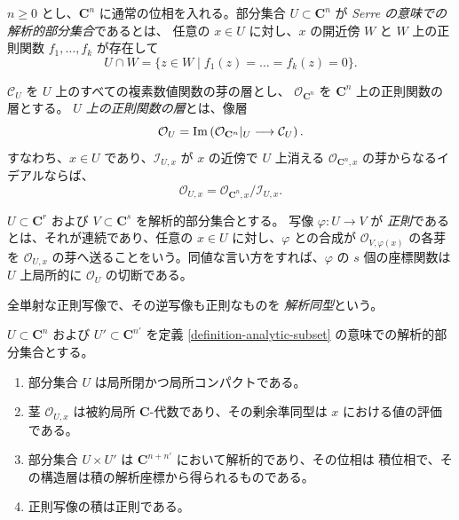 \begin{definition}
\label{definition-analytic-subset}
\begin{reference}
\cite[\S 1、第1項、3--4頁]{GAGA}
\end{reference}
$n \geq 0$ とし、$\mathbf C^n$ に通常の位相を入れる。部分集合
$U \subset \mathbf C^n$ が {\it Serre の意味での解析的部分集合}であるとは、
任意の $x \in U$ に対し、$x$ の開近傍 $W$ と $W$ 上の正則関数
$f_1, \ldots, f_k$ が存在して
$$
U \cap W = \{z \in W \mid f_1(z)=\ldots=f_k(z)=0\}.
$$

$\mathcal C_U$ を $U$ 上のすべての複素数値関数の芽の層とし、
$\mathcal O_{\mathbf C^n}$ を $\mathbf C^n$ 上の正則関数の層とする。
{\it $U$ 上の正則関数の層}とは、像層
$$
\mathcal O_U =
\mathop{\rm Im}\left(
\mathcal O_{\mathbf C^n}|_U \longrightarrow \mathcal C_U
\right).
$$
すなわち、$x \in U$ であり、$\mathcal I_{U,x}$ が $x$ の近傍で $U$ 上消える
$\mathcal O_{\mathbf C^n,x}$ の芽からなるイデアルならば、
$$
\mathcal O_{U,x}=
\mathcal O_{\mathbf C^n,x}/\mathcal I_{U,x}.
$$
\end{definition}

\begin{definition}
\label{definition-holomorphic-map-analytic-subsets}
\begin{reference}
\cite[\S 1、第1項、3--4頁]{GAGA}
\end{reference}
$U \subset \mathbf C^r$ および $V \subset \mathbf C^s$ を解析的部分集合とする。
写像 $\varphi:U\to V$ が {\it 正則}であるとは、それが連続であり、任意の
$x\in U$ に対し、$\varphi$ との合成が $\mathcal O_{V,\varphi(x)}$ の各芽を
$\mathcal O_{U,x}$ の芽へ送ることをいう。同値な言い方をすれば、$\varphi$ の
$s$ 個の座標関数は $U$ 上局所的に $\mathcal O_U$ の切断である。

全単射な正則写像で、その逆写像も正則なものを {\it 解析同型}という。
\end{definition}

\begin{lemma}
\label{lemma-analytic-subset-basic-properties}
$U \subset \mathbf C^n$ および $U' \subset \mathbf C^{n'}$ を定義
\ref{definition-analytic-subset} の意味での解析的部分集合とする。
\begin{enumerate}
\item 部分集合 $U$ は局所閉かつ局所コンパクトである。
\item 茎 $\mathcal O_{U,x}$ は被約局所 $\mathbf C$-代数であり、その剰余準同型は
$x$ における値の評価である。
\item 部分集合 $U\times U'$ は $\mathbf C^{n+n'}$ において解析的であり、その位相は
積位相で、その構造層は積の解析座標から得られるものである。
\item 正則写像の積は正則である。
\end{enumerate}
\end{lemma}

